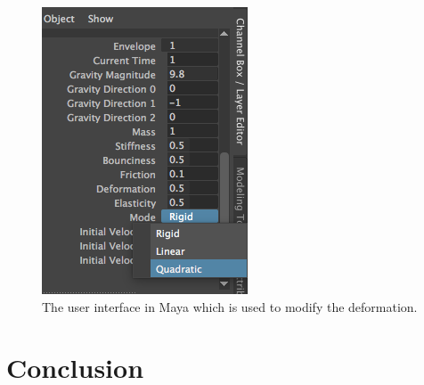  \begin{figure}[t]
    \includegraphics[width=\linewidth]{img/gui.png}
    \caption{The user interface in Maya which is used to modify the deformation.}
    \label{fig:gui}
    \end{figure}

\section{Conclusion}



\pagebreak



